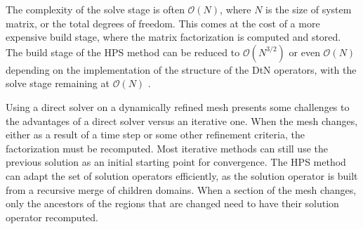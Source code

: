 The complexity of the solve stage is often $\mathcal{O}(N)$, where $N$ is the size of system matrix, or the total degrees of freedom. This comes at the cost of a more expensive build stage, where the matrix factorization is computed and stored. The build stage of the HPS method can be reduced to $\mathcal{O}(N^{3/2})$ or even $\mathcal{O}(N)$ depending on the implementation of the structure of the DtN operators, with the solve stage remaining at $\mathcal{O}(N)$ \citep{gillman2014direct}. 

Using a direct solver on a dynamically refined mesh presents some challenges to the advantages of a direct solver versus an iterative one. When the mesh changes, either as a result of a time step or some other refinement criteria, the factorization must be recomputed. Most iterative methods can still use the previous solution as an initial starting point for convergence. The HPS method can adapt the set of solution operators efficiently, as the solution operator is built from a recursive merge of children domains. When a section of the mesh changes, only the ancestors of the regions that are changed need to have their solution operator recomputed.